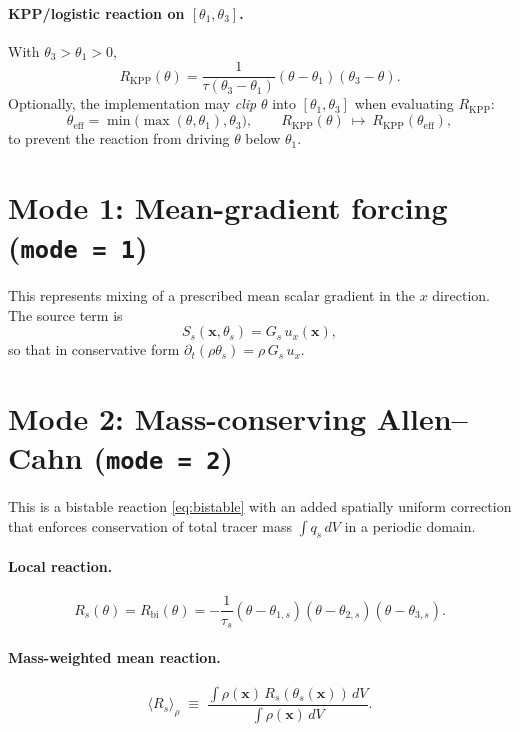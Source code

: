 \paragraph{KPP/logistic reaction on $[\theta_1,\theta_3]$.}
With $\theta_3>\theta_1>0$,
\begin{equation}
R_{\mathrm{KPP}}(\theta)
= \frac{1}{\tau(\theta_3-\theta_1)}(\theta-\theta_1)(\theta_3-\theta).
\label{eq:kpp}
\end{equation}
Optionally, the implementation may \emph{clip} $\theta$ into $[\theta_1,\theta_3]$ when evaluating $R_{\mathrm{KPP}}$:
\[
\theta_{\mathrm{eff}} = \min\big(\max(\theta,\theta_1),\theta_3\big),
\qquad
R_{\mathrm{KPP}}(\theta)\ \mapsto\ R_{\mathrm{KPP}}(\theta_{\mathrm{eff}}),
\]
to prevent the reaction from driving $\theta$ below $\theta_1$.

\section*{Mode 1: Mean-gradient forcing (\texttt{mode = 1})}

This represents mixing of a prescribed mean scalar gradient in the $x$ direction.
The source term is
\begin{equation}
S_s(\mathbf{x},\theta_s) = G_s\,u_x(\mathbf{x}),
\label{eq:meangrad}
\end{equation}
so that in conservative form $\partial_t(\rho\theta_s)=\rho\,G_s\,u_x$.

\section*{Mode 2: Mass-conserving Allen--Cahn (\texttt{mode = 2})}

This is a bistable reaction \eqref{eq:bistable} with an added spatially uniform correction that enforces conservation of total tracer mass $\int q_s\,dV$ in a periodic domain.

\paragraph{Local reaction.}
\[
R_s(\theta) = R_{\mathrm{bi}}(\theta)
= -\frac{1}{\tau_s}(\theta-\theta_{1,s})(\theta-\theta_{2,s})(\theta-\theta_{3,s}).
\]

\paragraph{Mass-weighted mean reaction.}
\begin{equation}
\langle R_s\rangle_\rho \;\equiv\;
\frac{\displaystyle \int \rho(\mathbf{x})\,R_s(\theta_s(\mathbf{x}))\,dV}
{\displaystyle \int \rho(\mathbf{x})\,dV}.
\label{eq:rbar}
\end{equation}

